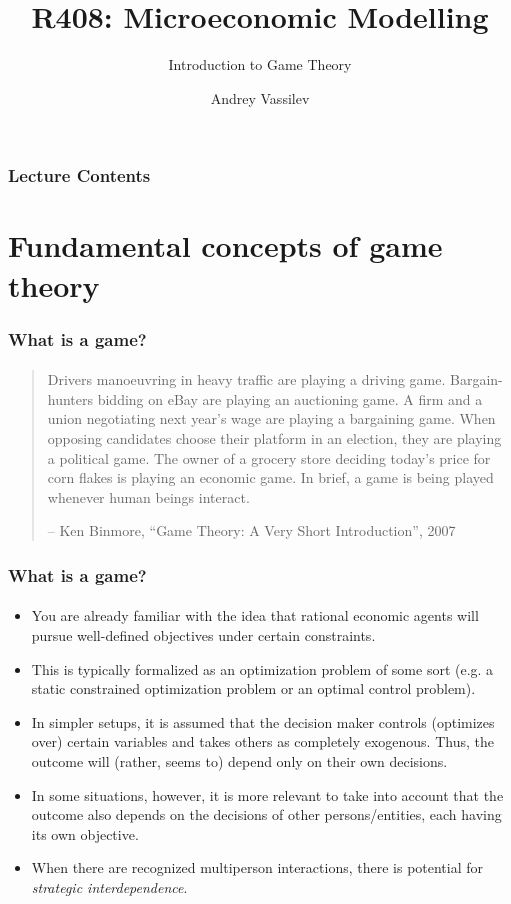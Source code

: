 \documentclass[10pt]{beamer}
\title{R408: Microeconomic Modelling}
\subtitle{\textcolor{myred}{Introduction to Game Theory}}
\author{Andrey Vassilev}
\date{}
\theoremstyle{definition}
\begin{document}
\maketitle

\begin{frame}[fragile]
\frametitle{Lecture Contents}
\tableofcontents
\end{frame} 

\section{Fundamental concepts of game theory}


\begin{frame}[fragile]
\frametitle{What is a game?}
\framesubtitle{}
\begin{quote}
Drivers manoeuvring in heavy traffic are playing a driving game.
Bargain-hunters bidding on eBay are playing an auctioning game.
A firm and a union negotiating next year's wage are playing a
bargaining game. When opposing candidates choose their
platform in an election, they are playing a political game. The
owner of a grocery store deciding today's price for corn flakes is
playing an economic game. In brief, a game is being played
whenever human beings interact.

\begin{flushright}
-- Ken Binmore, ``Game Theory: A Very Short Introduction'', 2007
\end{flushright}
\end{quote}
\end{frame}



\begin{frame}[fragile]
\frametitle{What is a game?}
\framesubtitle{}
\begin{itemize}\itemsep1em
\item You are already familiar with the idea that rational economic agents will pursue well-defined objectives under certain constraints.
\item This is typically formalized as an optimization problem of some sort (e.g. a static constrained optimization problem or an optimal control problem).
\item In simpler setups, it is assumed that the decision maker controls (optimizes over) certain variables and takes others as completely exogenous. Thus, the outcome will (rather, seems to) depend only on their own decisions.
\item In some situations, however, it is more relevant to take into account that the outcome also depends on the decisions of other persons/entities, each having its own objective.
\item When there are recognized multiperson interactions, there is potential for \emph{strategic interdependence}.
\end{itemize}
\end{frame}
\end{document}
